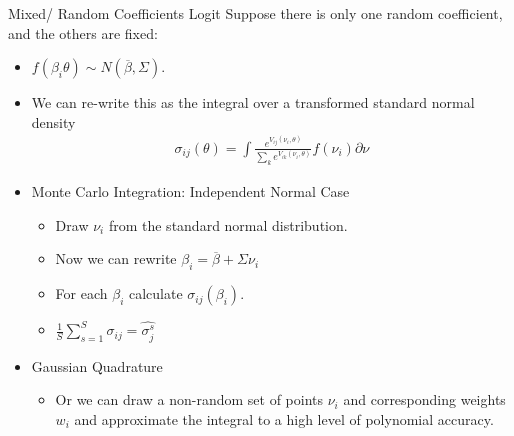 \documentclass[aspectratio=169,11pt]{beamer}
\begin{document}
%

\begin{frame}{Mixed/ Random Coefficients Logit}
Suppose there is only one random coefficient, and the others are fixed:
\begin{itemize}
\item $f(\beta_i \theta) \sim N(\overline{\beta},\Sigma)$.
\item We can re-write this as the integral over a transformed standard normal density
\begin{eqnarray*}
\sigma_{ij}(\theta) = \int \frac{ e^{V_{ij}(\nu_i,\theta)}}{\sum_k e^{V_{ik}(\nu_i,\theta)}} f(\nu_i) \partial \nu
\end{eqnarray*}
\item Monte Carlo Integration: Independent Normal Case
\begin{itemize}
\item Draw $\nu_i$ from the standard normal distribution.
\item Now we can rewrite $\beta_i = \overline{\beta} + \Sigma \nu_i$
\item For each $\beta_i$ calculate $\sigma_{ij}(\beta_i)$.
\item $\frac{1}{S} \sum_{s=1}^S \sigma_{ij} = \widehat{\sigma_{j}^{s}}$
\end{itemize}
\item Gaussian Quadrature
\begin{itemize}
\item Or we can draw a non-random set of points $\nu_i$ and corresponding weights $w_i$ and approximate the integral to a high level of polynomial accuracy.
\end{itemize}
\end{itemize}
\end{frame}
\end{document}
